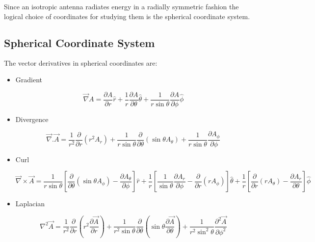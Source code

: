 Since an isotropic antenna radiates energy in a radially symmetric fashion the logical choice of coordinates for studying them is the spherical coordinate system.

\subsection{Spherical Coordinate System}

The vector derivatives in spherical coordinates are:

\begin{itemize}

   \item Gradient

      \begin{equation}
      \vec{\nabla} A = \frac{\partial A}{\partial r}\hat{r}+\frac{1}{r}\frac{\partial A}{\partial \theta}\hat{\theta}+\frac{1}{r\sin\theta}\frac{\partial A}{\partial \phi}\hat{\phi}
      \end{equation}

   \item Divergence

      \begin{equation}
      \vec{\nabla}.\vec{A} = \frac{1}{r^2}\frac{\partial}{\partial r}(r^2A_r)+\frac{1}{r\sin\theta}\frac{\partial}{\partial\theta}(\sin\theta A_\theta)+\frac{1}{r\sin\theta}\frac{\partial A_\phi}{\partial\phi}
      \end{equation}

   \item Curl

      \begin{equation}
      \vec{\nabla}\times\vec{A} = \frac{1}{r\sin\theta}\left[\frac{\partial}{\partial\theta}(\sin\theta A_\phi)-\frac{\partial A_\theta}{\partial\phi}\right]\hat{r}+\frac{1}{r}\left[\frac{1}{\sin\theta}\frac{\partial A_r}{\partial\phi}-\frac{\partial}{\partial r}(rA_\phi)\right]\hat{\theta}+\frac{1}{r}\left[\frac{\partial}{\partial r}(rA_\theta)-\frac{\partial A_r}{\partial \theta}\right]\hat{\phi}
      \end{equation}

   \item Laplacian

      \begin{equation}\label{laplacian}
      \nabla^2 \vec{A} = \frac{1}{r^2}\frac{\partial}{\partial r}(r^2\frac{\partial\vec{A}}{\partial r})+\frac{1}{r^2\sin\theta}\frac{\partial}{\partial\theta}(\sin\theta\frac{\partial\vec{A}}{\partial \theta})+\frac{1}{r^2\sin^2\theta}\frac{\partial^2\vec{A}}{\partial \phi^2}
      \end{equation}

\end{itemize}

